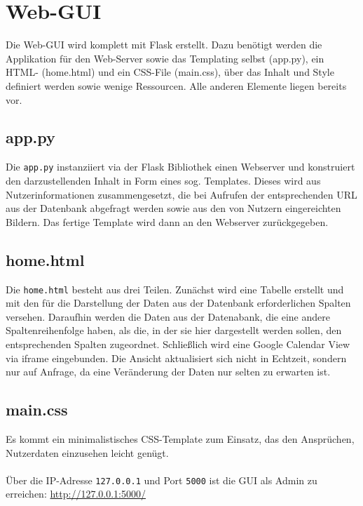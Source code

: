     
    \section{Web-GUI}
        Die Web-GUI wird komplett mit Flask erstellt. Dazu benötigt werden die Applikation für den Web-Server sowie das Templating selbst (app.py), ein HTML- (home.html) und ein CSS-File (main.css), über das Inhalt und Style definiert werden sowie wenige Ressourcen. Alle anderen Elemente liegen bereits vor.
        
        \subsection{app.py} \label{app.py}
            Die \verb|app.py| instanziiert via der Flask Bibliothek einen Webserver und konstruiert den darzustellenden Inhalt in Form eines sog. Templates. Dieses wird aus Nutzerinformationen zusammengesetzt, die bei Aufrufen der entsprechenden URL aus der Datenbank abgefragt werden sowie aus den von Nutzern eingereichten Bildern. 
            Das fertige Template wird dann an den Webserver zurückgegeben.

        \subsection{home.html} \label{home.html}
            Die \verb|home.html| besteht aus drei Teilen. Zunächst wird eine Tabelle erstellt und mit den für die Darstellung der Daten aus der Datenbank erforderlichen Spalten versehen. Daraufhin werden die Daten aus der Datenabank, die eine andere Spaltenreihenfolge haben, als die, in der sie hier dargestellt werden sollen, den entsprechenden Spalten zugeordnet.
            Schließlich wird eine Google Calendar View via iframe eingebunden.
            Die Ansicht aktualisiert sich nicht in Echtzeit, sondern nur auf Anfrage, da eine Veränderung der Daten nur selten zu erwarten ist.

        \subsection{main.css} \label{main.css}
            Es kommt ein minimalistisches CSS-Template zum Einsatz, das den Ansprüchen, Nutzerdaten einzusehen leicht genügt.\\ \\

        Über die IP-Adresse \verb|127.0.0.1| und Port \verb|5000| ist die GUI als Admin zu erreichen: \url{http://127.0.0.1:5000/}


